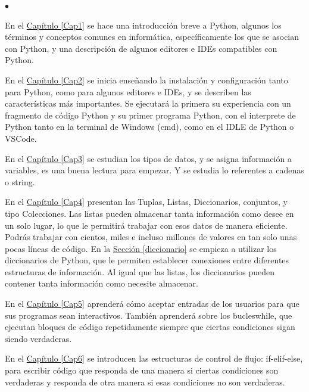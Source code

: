 \begin{list}{$\bullet$}{}  
	
	\item En el \hyperlink{Cap1}{Capítulo \ref{Cap1}} se hace una introducción breve a Python, algunos los términos y conceptos comunes en informática, específicamente los que se asocian con Python, y una descripción de algunos editores e IDEs compatibles con Python.
		
	\item En el \hyperlink{Cap2}{Capítulo \ref{Cap2}} se inicia enseñando la instalación y configuración tanto para Python, como para algunos editores e IDEs, y se describen las características más importantes. Se ejecutará la primera su experiencia con un fragmento de código Python y su primer programa Python, con el interprete de Python tanto en la terminal de Windows (cmd), como en  el IDLE de Python o VSCode.
		
	
	\item En el \hyperlink{Cap3}{Capítulo \ref{Cap3}} se estudian los tipos de datos, y se asigna información a variables, es una buena lectura para empezar. Y se estudia lo referentes a cadenas o string.
	
	\item  En el \hyperlink{Cap4}{Capítulo \ref{Cap4}}  presentan las Tuplas, Listas, Diccionarios, conjuntos, y tipo  Colecciones. Las listas pueden almacenar tanta información como desee en un solo lugar, lo que le permitirá trabajar con esos datos de manera eficiente. Podrás trabajar con cientos, miles e incluso millones de valores en tan solo unas pocas líneas de código.
	En la \hyperlink{diccionario}{Sección \ref{diccionario}} se empieza a utilizar los diccionarios de Python, que le permiten establecer conexiones entre diferentes estructuras de información. Al igual que las listas, los diccionarios pueden contener tanta información como necesite almacenar.


	\item  En el \hyperlink{Cap5}{Capítulo \ref{Cap5}}  aprenderá cómo aceptar entradas de los usuarios para que sus programas sean interactivos. También aprenderá sobre los bucles{\ttfamily while}, que ejecutan bloques de código repetidamente siempre que ciertas condiciones sigan siendo verdaderas.
	
	
	\item En el \hyperlink{Cap6}{Capítulo \ref{Cap6}}  se introducen las estructuras de control de flujo: {\ttfamily if-elif-else}, para escribir código que responda de una manera si ciertas condiciones son verdaderas y responda de otra manera si esas condiciones no son verdaderas.
	

\end{list}
